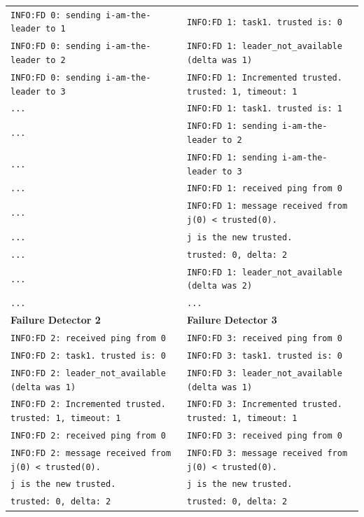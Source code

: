 \documentclass[a4paper]{article}
\begin{document}
\begin{compactitem}
\begin{table}[H]
\begin{tabular}{ll}
		\verb|INFO:FD 0: sending i-am-the-leader to 1| & \verb|INFO:FD 1: task1. trusted is: 0| \\
		\verb|INFO:FD 0: sending i-am-the-leader to 2| & \verb|INFO:FD 1: leader_not_available (delta was 1)| \\
		\verb|INFO:FD 0: sending i-am-the-leader to 3| & \verb|INFO:FD 1: Incremented trusted. trusted: 1, timeout: 1| \\
		\verb|...| & \verb|INFO:FD 1: task1. trusted is: 1| \\
		\verb|...| & \verb|INFO:FD 1: sending i-am-the-leader to 2| \\
		\verb|...| & \verb|INFO:FD 1: sending i-am-the-leader to 3| \\
		\verb|...| & \verb|INFO:FD 1: received ping from 0| \\
		\verb|...| & \verb|INFO:FD 1: message received from j(0) < trusted(0). | \\
		\verb|...| & \hspace{16pt}\verb|j is the new trusted.| \\
		\verb|...| & \verb|trusted: 0, delta: 2| \\
		\verb|...| & \verb|INFO:FD 1: leader_not_available (delta was 2)| \\
		\verb|...| & \verb|...| \\
        \midrule
		\textbf{Failure Detector 2} & \textbf{Failure Detector 3} \\
		\midrule
        \verb|INFO:FD 2: received ping from 0| & \verb|INFO:FD 3: received ping from 0| \\
		\verb|INFO:FD 2: task1. trusted is: 0| & \verb|INFO:FD 3: task1. trusted is: 0| \\
		\verb|INFO:FD 2: leader_not_available (delta was 1)| & \verb|INFO:FD 3: leader_not_available (delta was 1)| \\
		\verb|INFO:FD 2: Incremented trusted. trusted: 1, timeout: 1| & \verb|INFO:FD 3: Incremented trusted. trusted: 1, timeout: 1| \\
		\verb|INFO:FD 2: received ping from 0| & \verb|INFO:FD 3: received ping from 0| \\
		\verb|INFO:FD 2: message received from j(0) < trusted(0). | & \verb|INFO:FD 3: message received from j(0) < trusted(0). | \\
		\hspace{16pt}\verb|j is the new trusted.| & \hspace{16pt}\verb|j is the new trusted.| \\
		\verb|trusted: 0, delta: 2| & \verb|trusted: 0, delta: 2| \\

\end{tabular}
\end{table}
\end{compactitem}
\end{document}
